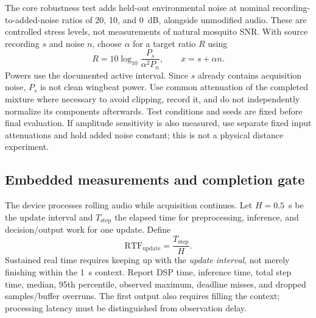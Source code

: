 \documentclass[a4paper,11pt]{article}
\begin{document}
The core robustness test adds held-out environmental noise at nominal recording-to-added-noise ratios of 20, 10, and 0~dB, alongside unmodified audio. These are controlled stress levels, not measurements of natural mosquito SNR. With source recording $s$ and noise $n$, choose $\alpha$ for a target ratio $R$ using
\begin{equation}
 R=10\log_{10}\frac{P_s}{\alpha^2 P_n},\qquad x=s+\alpha n.
 \label{eq:ratio}
\end{equation}
Powers use the documented active interval. Since $s$ already contains acquisition noise, $P_s$ is not clean wingbeat power. Use common attenuation of the completed mixture where necessary to avoid clipping, record it, and do not independently normalize its components afterwards. Test conditions and seeds are fixed before final evaluation. If amplitude sensitivity is also measured, use separate fixed input attenuations and hold added noise constant; this is not a physical distance experiment.

\subsection{Embedded measurements and completion gate}
The device processes rolling audio while acquisition continues. Let $H=0.5$~s be the update interval and $T_{\mathrm{step}}$ the elapsed time for preprocessing, inference, and decision/output work for one update. Define
\begin{equation}
 \mathrm{RTF}_{\mathrm{update}}=\frac{T_{\mathrm{step}}}{H}.
\end{equation}
Sustained real time requires keeping up with the \emph{update interval}, not merely finishing within the 1~s context. Report DSP time, inference time, total step time, median, 95th percentile, observed maximum, deadline misses, and dropped samples/buffer overruns. The first output also requires filling the context; processing latency must be distinguished from observation delay.
\end{document}
